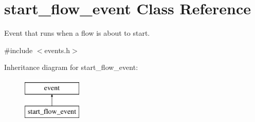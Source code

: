 \hypertarget{classstart__flow__event}{\section{start\-\_\-flow\-\_\-event Class Reference}
\label{classstart__flow__event}
}


Event that runs when a flow is about to start.  




{\ttfamily \#include $<$events.\-h$>$}

Inheritance diagram for start\-\_\-flow\-\_\-event\-:\begin{figure}[H]
\begin{center}
\leavevmode
\includegraphics[height=2.000000cm]{classstart__flow__event}
\end{center}
\end{figure}
